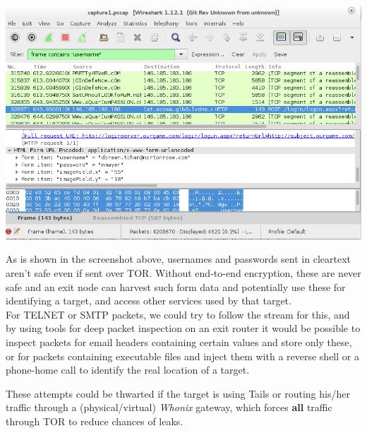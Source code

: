 \includegraphics[scale=0.5]{wireshark_username.png}

As is shown in the screenshot above, usernames and passwords sent in cleartext aren't safe even if sent over TOR. Without end-to-end encryption, these are never safe and an exit node can harvest such form data and potentially use these for identifying a target, and access other services used by that target.\\

For TELNET or SMTP packets, we could try to follow the stream for this, and by using tools for deep packet inspection on an exit router it would be possible to inspect packets for email headers containing certain values and store only these, or for packets containing executable files and inject them with a reverse shell or a phone-home call to identify the real location of a target.

These attempts could be thwarted if the target is using Tails or routing his/her traffic through a (physical/virtual) \textit{Whonix} gateway, which forces \textbf{all} traffic through TOR to reduce chances of leaks. 
